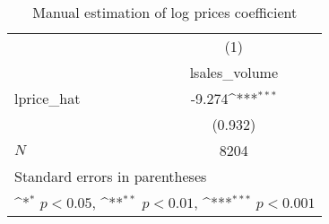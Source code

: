 \begin{table}[htbp]\centering
\def\sym#1{\ifmmode^{#1}\else\(^{#1}\)\fi}
\caption{Manual estimation of log prices coefficient}
\begin{tabular}{l*{1}{c}}
\hline\hline
            &\multicolumn{1}{c}{(1)}\\
            &\multicolumn{1}{c}{lsales\_volume}\\
\hline
lprice\_hat  &      -9.274\sym{***}\\
            &     (0.932)         \\
\hline
\(N\)       &        8204         \\
\hline\hline
\multicolumn{2}{l}{\footnotesize Standard errors in parentheses}\\
\multicolumn{2}{l}{\footnotesize \sym{*} \(p<0.05\), \sym{**} \(p<0.01\), \sym{***} \(p<0.001\)}\\
\end{tabular}
\end{table}
